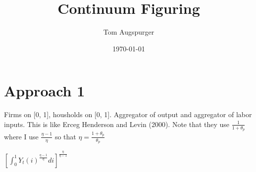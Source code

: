 \documentclass[11pt]{article}
\title{Continuum Figuring}
\author{Tom Augspurger}
\date{\today}
\begin{document}
\maketitle

\section{Approach 1}
\label{sec:approach_1}
Firms on [0, 1], housholds on [0, 1]. Aggregator of output and aggregator of labor inputs.
This is like Erceg Henderson and Levin (2000).
Note that they use $\frac{1}{1 + \theta_p}$ where I use $\frac{\eta - 1}{\eta}$ so that $\eta = \frac{1 + \theta_p}{\theta_p}$

$\left[\int_{0}^{1}Y_t(i)^{\frac{\eta - 1}{\eta}} di \right]^{ \frac{\eta}{\eta - 1} }$
\end{document}
